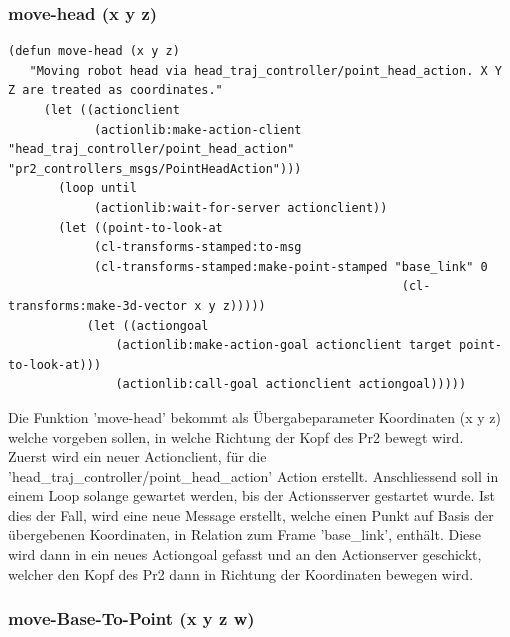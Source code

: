 \documentclass{suturo}
\begin{document}
\subsubsection{move-head (x y z)}

\noindent
\begin{minipage}{\linewidth}
\begin{lstlisting}
(defun move-head (x y z)
   "Moving robot head via head_traj_controller/point_head_action. X Y Z are treated as coordinates."
     (let ((actionclient 
            (actionlib:make-action-client "head_traj_controller/point_head_action" "pr2_controllers_msgs/PointHeadAction")))
       (loop until
            (actionlib:wait-for-server actionclient))
       (let ((point-to-look-at 
            (cl-transforms-stamped:to-msg 
            (cl-transforms-stamped:make-point-stamped "base_link" 0 
                                                       (cl-transforms:make-3d-vector x y z)))))
           (let ((actiongoal 
               (actionlib:make-action-goal actionclient target point-to-look-at)))
               (actionlib:call-goal actionclient actiongoal)))))
\end{lstlisting}
\end{minipage}

Die Funktion 'move-head' bekommt als \"Ubergabeparameter Koordinaten (x y z) welche vorgeben sollen, in welche Richtung der Kopf des Pr2 bewegt wird.\\
Zuerst wird ein neuer Actionclient, für die 'head\_traj\_controller/point\_head\_action' Action erstellt. Anschliessend soll in einem Loop solange gewartet werden, bis der Actionsserver gestartet wurde. Ist dies der Fall, wird eine neue Message erstellt, welche einen Punkt auf Basis der \"ubergebenen Koordinaten, in Relation zum Frame 'base\_link', enth\"alt. Diese wird dann in ein neues Actiongoal gefasst und an den Actionserver geschickt, welcher den Kopf des Pr2 dann in Richtung der Koordinaten bewegen wird.


\subsubsection{move-Base-To-Point (x y z w)}
\end{document}
